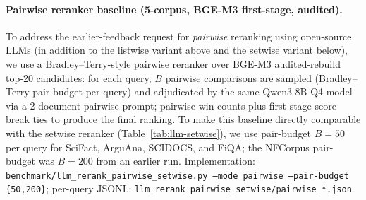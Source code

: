 \documentclass[review,1p]{elsarticle}
\begin{document}
\paragraph{Pairwise reranker baseline (5-corpus, BGE-M3 first-stage, audited).} To address the earlier-feedback request for \emph{pairwise} reranking using open-source LLMs (in addition to the listwise variant above and the setwise variant below), we use a Bradley--Terry-style pairwise reranker over BGE-M3 audited-rebuild top-20 candidates: for each query, $B$ pairwise comparisons are sampled (Bradley--Terry pair-budget per query) and adjudicated by the same Qwen3-8B-Q4 model via a 2-document pairwise prompt; pairwise win counts plus first-stage score break ties to produce the final ranking. To make this baseline directly comparable with the setwise reranker (Table~\ref{tab:llm-setwise}), we use pair-budget $B=50$ per query for SciFact, ArguAna, SCIDOCS, and FiQA; the NFCorpus pair-budget was $B=200$ from an earlier run. Implementation: \texttt{benchmark/llm\_rerank\_pairwise\_setwise.py --mode pairwise --pair-budget \{50,200\}}; per-query JSONL: \texttt{llm\_rerank\_pairwise\_setwise/pairwise\_*.json}.
\end{document}
